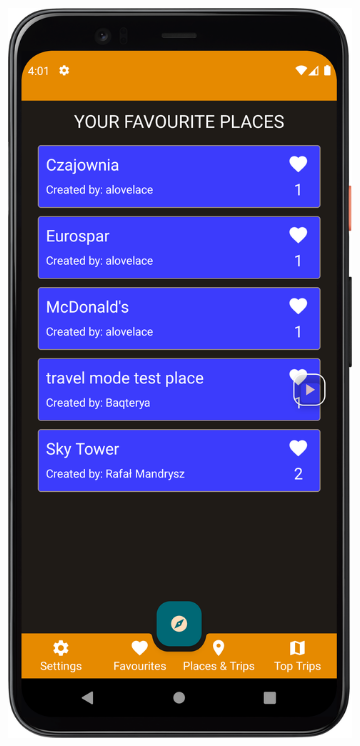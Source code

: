         \vspace{1cm}
        \begin{figure}[H]
            \centering
            \begin{subfigure}[b]{0.3\textwidth}
                \centering
                \includegraphics[width=\textwidth]{src/app/fav_places.png}

\end{subfigure}
\end{figure}
